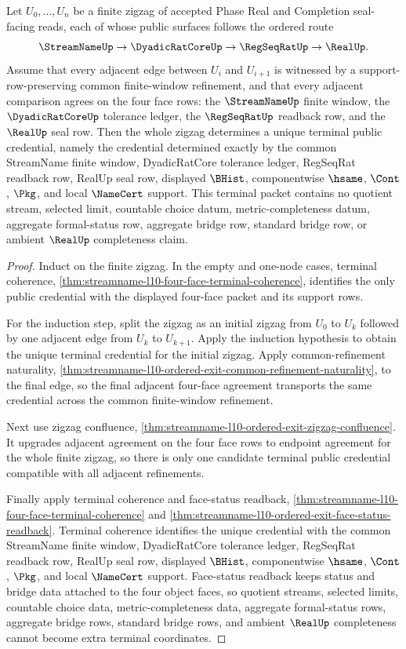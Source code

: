 \begin{theorem}
\label{thm:streamname-l10-ordered-exit-zigzag-terminality}
Let $U_0,\ldots,U_n$ be a finite zigzag of accepted Phase Real and Completion seal-facing reads, each of whose public surfaces follows the ordered route
$$
\StreamNameUp \to \DyadicRatCoreUp \to \RegSeqRatUp \to \RealUp .
$$
Assume that every adjacent edge between $U_i$ and $U_{i+1}$ is witnessed by a support-row-preserving common finite-window refinement, and that every adjacent comparison agrees on the four face rows: the $\StreamNameUp$ finite window, the $\DyadicRatCoreUp$ tolerance ledger, the $\RegSeqRatUp$ readback row, and the $\RealUp$ seal row. Then the whole zigzag determines a unique terminal public credential, namely the credential determined exactly by the common StreamName finite window, DyadicRatCore tolerance ledger, RegSeqRat readback row, RealUp seal row, displayed $\BHist$, componentwise $\hsame$, $\Cont$, $\Pkg$, and local $\NameCert$ support. This terminal packet contains no quotient stream, selected limit, countable choice datum, metric-completeness datum, aggregate formal-status row, aggregate bridge row, standard bridge row, or ambient $\RealUp$ completeness claim.
\end{theorem}
\begin{proof}
Induct on the finite zigzag. In the empty and one-node cases, terminal coherence, \autoref{thm:streamname-l10-four-face-terminal-coherence}, identifies the only public credential with the displayed four-face packet and its support rows.

For the induction step, split the zigzag as an initial zigzag from $U_0$ to $U_k$ followed by one adjacent edge from $U_k$ to $U_{k+1}$. Apply the induction hypothesis to obtain the unique terminal credential for the initial zigzag. Apply common-refinement naturality, \autoref{thm:streamname-l10-ordered-exit-common-refinement-naturality}, to the final edge, so the final adjacent four-face agreement transports the same credential across the common finite-window refinement.

Next use zigzag confluence, \autoref{thm:streamname-l10-ordered-exit-zigzag-confluence}. It upgrades adjacent agreement on the four face rows to endpoint agreement for the whole finite zigzag, so there is only one candidate terminal public credential compatible with all adjacent refinements.

Finally apply terminal coherence and face-status readback, \autoref{thm:streamname-l10-four-face-terminal-coherence} and \autoref{thm:streamname-l10-ordered-exit-face-status-readback}. Terminal coherence identifies the unique credential with the common StreamName finite window, DyadicRatCore tolerance ledger, RegSeqRat readback row, RealUp seal row, displayed $\BHist$, componentwise $\hsame$, $\Cont$, $\Pkg$, and local $\NameCert$ support. Face-status readback keeps status and bridge data attached to the four object faces, so quotient streams, selected limits, countable choice data, metric-completeness data, aggregate formal-status rows, aggregate bridge rows, standard bridge rows, and ambient $\RealUp$ completeness cannot become extra terminal coordinates.
\end{proof}
